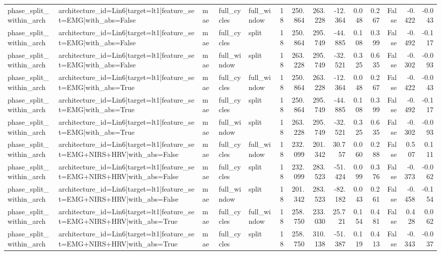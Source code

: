 \begin{table}
\begin{tabular}{lllllrrrrrrrrr}
phase_split_within_arch & architecture_id=Lin6|target=lt1|feature_set=EMG|with_abs=False & mae & full_cycles & full_window & 18 & 250.864 & 263.228 & -12.364 & 0.048 & 0.267 & False & -0.422 & -0.043 \\
phase_split_within_arch & architecture_id=Lin6|target=lt1|feature_set=EMG|with_abs=False & mae & full_cycles & split & 18 & 250.864 & 295.749 & -44.885 & 0.108 & 0.399 & False & -0.492 & -0.117 \\
phase_split_within_arch & architecture_id=Lin6|target=lt1|feature_set=EMG|with_abs=False & mae & full_window & split & 18 & 263.228 & 295.749 & -32.521 & 0.325 & 0.635 & False & -0.302 & -0.093 \\
phase_split_within_arch & architecture_id=Lin6|target=lt1|feature_set=EMG|with_abs=True & mae & full_cycles & full_window & 18 & 250.864 & 263.228 & -12.364 & 0.048 & 0.267 & False & -0.422 & -0.043 \\
phase_split_within_arch & architecture_id=Lin6|target=lt1|feature_set=EMG|with_abs=True & mae & full_cycles & split & 18 & 250.864 & 295.749 & -44.885 & 0.108 & 0.399 & False & -0.492 & -0.117 \\
phase_split_within_arch & architecture_id=Lin6|target=lt1|feature_set=EMG|with_abs=True & mae & full_window & split & 18 & 263.228 & 295.749 & -32.521 & 0.325 & 0.635 & False & -0.302 & -0.093 \\
phase_split_within_arch & architecture_id=Lin6|target=lt1|feature_set=EMG+NIRS+HRV|with_abs=False & mae & full_cycles & full_window & 18 & 232.099 & 201.342 & 30.757 & 0.060 & 0.288 & False & 0.507 & 0.111 \\
phase_split_within_arch & architecture_id=Lin6|target=lt1|feature_set=EMG+NIRS+HRV|with_abs=False & mae & full_cycles & split & 18 & 232.099 & 283.523 & -51.424 & 0.099 & 0.376 & False & -0.373 & -0.062 \\
phase_split_within_arch & architecture_id=Lin6|target=lt1|feature_set=EMG+NIRS+HRV|with_abs=False & mae & full_window & split & 18 & 201.342 & 283.523 & -82.182 & 0.043 & 0.261 & False & -0.458 & -0.154 \\
phase_split_within_arch & architecture_id=Lin6|target=lt1|feature_set=EMG+NIRS+HRV|with_abs=True & mae & full_cycles & full_window & 18 & 258.750 & 233.030 & 25.721 & 0.154 & 0.481 & False & 0.428 & 0.062 \\
phase_split_within_arch & architecture_id=Lin6|target=lt1|feature_set=EMG+NIRS+HRV|with_abs=True & mae & full_cycles & split & 18 & 258.750 & 310.138 & -51.387 & 0.119 & 0.413 & False & -0.343 & -0.037 \\

\end{tabular}
\end{table}
